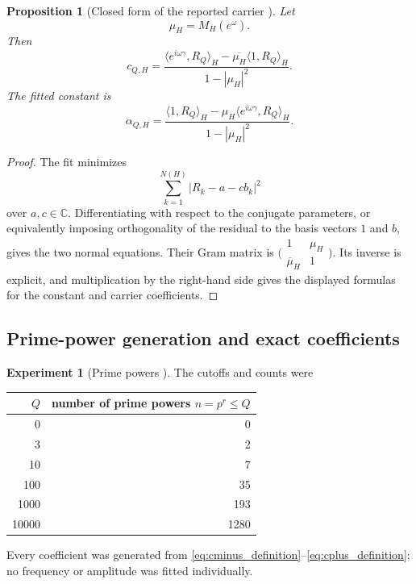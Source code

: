 \documentclass[11pt]{amsart}
\numberwithin{equation}{section}
\theoremstyle{plain}
\newtheorem{proposition}[theorem]{Proposition}
\theoremstyle{definition}
\newtheorem{experiment}[theorem]{Experiment}
\theoremstyle{remark}
\newcommand{\1}{\mathbf{1}}
\begin{document}
\begin{proposition}[Closed form of the reported carrier {}]
\label{prop:numerical_joint_carrier}
Let
\begin{equation}
\mu_H=M_H(e^\omega).
\label{eq:numerical_muH}
\end{equation}
Then
\begin{equation}
\boxed{
c_{Q,H}
=
\frac{
\langle e^{i\omega\gamma},R_Q\rangle_H
-
\overline{\mu_H}\langle1,R_Q\rangle_H
}{1-|\mu_H|^2}.
}
\label{eq:numerical_joint_carrier}
\end{equation}
The fitted constant is
\begin{equation}
\alpha_{Q,H}
=
\frac{
\langle1,R_Q\rangle_H
-
\mu_H\langle e^{i\omega\gamma},R_Q\rangle_H
}{1-|\mu_H|^2}.
\label{eq:numerical_joint_constant}
\end{equation}
\end{proposition}

\begin{proof}
The fit minimizes
\begin{equation}
\sum_{k=1}^{N(H)}|R_k-a-cb_k|^2
\label{eq:numerical_joint_objective_proof}
\end{equation}
over \(a,c\in\mathbb C\).  Differentiating with respect to the conjugate
parameters, or equivalently imposing orthogonality of the residual to the
basis vectors \(1\) and \(b\), gives the two normal equations.  Their Gram
matrix is
\(\bigl(\begin{smallmatrix}1&\mu_H\\\overline\mu_H&1\end{smallmatrix}\bigr)\).
Its inverse is explicit, and multiplication by the right-hand side gives
the displayed formulas for the constant and carrier coefficients.
\end{proof}

\subsection{Prime-power generation and exact coefficients}
\label{subsec:numerical_prime_powers}

\begin{experiment}[Prime powers {\normalfont[Numerical]}]
\label{exp:numerical_prime_power_counts}
The cutoffs and counts were
\begin{center}
\begin{tabular}{rr}
\toprule
$Q$ & number of prime powers $n=p^r\leq Q$\\
\midrule
0 & 0\\
3 & 2\\
10 & 7\\
100 & 35\\
1000 & 193\\
10000 & 1280\\
\bottomrule
\end{tabular}
\end{center}
Every coefficient was generated from
\eqref{eq:cminus_definition}--\eqref{eq:cplus_definition}; no frequency or
amplitude was fitted individually.
\end{experiment}
\end{document}
